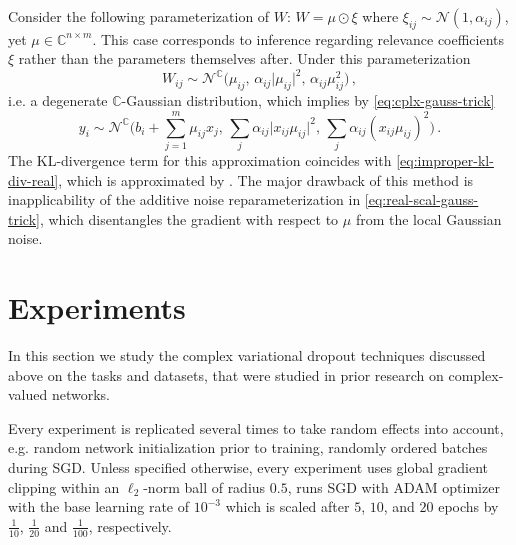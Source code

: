 \documentclass[a4paper,10pt]{article}
\newcommand{\cplx}{\mathbb{C}}
\begin{document}
Consider the following parameterization of $W$: $
  W = \mu \odot \xi
$ where $
  \xi_{ij} \sim \mathcal{N}(1, \alpha_{ij})
$, yet $\mu \in \cplx^{n \times m}$. This case corresponds to inference regarding
relevance coefficients $\xi$ rather than the parameters themselves after. Under this
parameterization
\begin{equation}  \label{eq:real-scal-gauss-vi}
  W_{ij}
    \sim \mathcal{N}^{\cplx} \bigl(
      \mu_{ij},
      \, \alpha_{ij} \lvert \mu_{ij} \rvert^2,
      \, \alpha_{ij} \mu_{ij}^2
    \bigr)
  \,,
\end{equation}
i.e. a degenerate $\cplx$-Gaussian distribution, which implies by \eqref{eq:cplx-gauss-trick}
\begin{equation}  \label{eq:real-scal-gauss-trick}
  y_i
    \sim \mathcal{N}^{\cplx}\bigl(
      b_i + \sum_{j=1}^m \mu_{ij} x_j,
      \, \sum_j \alpha_{ij} \lvert x_{ij} \mu_{ij}\rvert^2,
      \, \sum_j \alpha_{ij} (x_{ij} \mu_{ij})^2
    \bigr)
    \,.
\end{equation}
The KL-divergence term for this approximation coincides with \eqref{eq:improper-kl-div-real},
which is approximated by \citet{molchanov_variational_2017}. The major drawback of this method
is inapplicability of the additive noise reparameterization in \eqref{eq:real-scal-gauss-trick},
which disentangles the gradient with respect to $\mu$ from the local Gaussian noise.





\section{Experiments} %
\label{sec:experiments}

In this section we study the complex variational dropout techniques discussed above
on the tasks and datasets, that were studied in prior research on complex-valued networks.

Every experiment is replicated several times to take random effects into account, e.g.
random network initialization prior to training, randomly ordered batches during SGD.
Unless specified otherwise, every experiment uses global gradient clipping within an
$\ell_2$-norm ball of radius $0.5$, runs SGD with ADAM optimizer with the base learning
rate of $10^{-3}$ which is scaled after $5$, $10$, and $20$ epochs by $\tfrac1{10}$,
$\tfrac1{20}$ and $\tfrac1{100}$, respectively.
\end{document}
